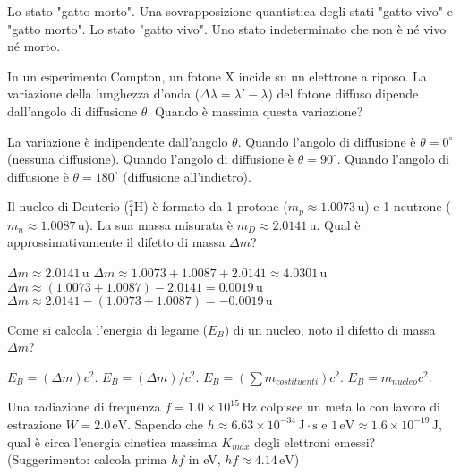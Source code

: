 \documentclass{exam}%
\begin{document}
\begin{questions}
\vspace{0.2em}%
\begin{choices}%
\choice Lo stato "gatto morto".%
\choice Una sovrapposizione quantistica degli stati "gatto vivo" e "gatto morto".%
\choice Lo stato "gatto vivo".%
\choice Uno stato indeterminato che non è né vivo né morto.%
\end{choices}%
\question In un esperimento Compton, un fotone X incide su un elettrone a riposo. La variazione della lunghezza d'onda ($\Delta \lambda = \lambda' - \lambda$) del fotone diffuso dipende dall'angolo di diffusione $\theta$. Quando è massima questa variazione?%
\vspace{0.2em}%
\begin{choices}%
\choice La variazione è indipendente dall'angolo $\theta$.%
\choice Quando l'angolo di diffusione è $\theta = 0^\circ$ (nessuna diffusione).%
\choice Quando l'angolo di diffusione è $\theta = 90^\circ$.%
\choice Quando l'angolo di diffusione è $\theta = 180^\circ$ (diffusione all'indietro).%
\end{choices}%
\question Il nucleo di Deuterio ($^2_1\text{H}$) è formato da 1 protone ($m_p \approx 1.0073 \, \text{u}$) e 1 neutrone ($m_n \approx 1.0087 \, \text{u}$). La sua massa misurata è $m_D \approx 2.0141 \, \text{u}$. Qual è approssimativamente il difetto di massa $\Delta m$?%
\vspace{0.2em}%
\begin{multicols}{2}%
\begin{choices}%
\choice $\Delta m \approx 2.0141 \, \text{u}$%
\choice $\Delta m \approx 1.0073 + 1.0087 + 2.0141 \approx 4.0301 \, \text{u}$%
\choice $\Delta m \approx (1.0073 + 1.0087) - 2.0141 = 0.0019 \, \text{u}$%
\choice $\Delta m \approx 2.0141 - (1.0073 + 1.0087) = -0.0019 \, \text{u}$%
\end{choices}%
\end{multicols}%
\question Come si calcola l'energia di legame ($E_B$) di un nucleo, noto il difetto di massa $\Delta m$?%
\vspace{0.2em}%
\begin{multicols}{4}%
\begin{choices}%
\choice $E_B = (\Delta m) c^2$.%
\choice $E_B = (\Delta m) / c^2$.%
\choice $E_B = (\sum m_{costituenti}) c^2$.%
\choice $E_B = m_{nucleo} c^2$.%
\end{choices}%
\end{multicols}%
\question Una radiazione di frequenza $f = 1.0 \times 10^{15} \, \text{Hz}$ colpisce un metallo con lavoro di estrazione $W = 2.0 \, \text{eV}$. Sapendo che $h \approx 6.63 \times 10^{-34} \, \text{J} \cdot \text{s}$ e $1 \, \text{eV} \approx 1.6 \times 10^{-19} \, \text{J}$, qual è circa l'energia cinetica massima $K_{max}$ degli elettroni emessi? (Suggerimento: calcola prima $hf$ in eV, $hf \approx 4.14 \, \text{eV}$)%

\end{questions}
\end{document}
